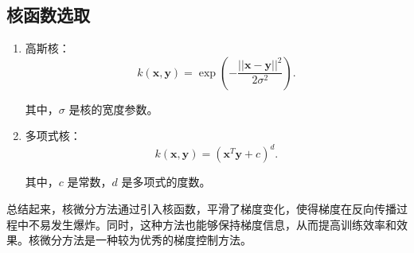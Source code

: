 \subsection{核函数选取}

\begin{enumerate}

\item 高斯核：
\begin{equation}
  k(\mathbf{x}, \mathbf{y}) = \exp\left(-\frac{||\mathbf{x} - \mathbf{y}||^2}{2\sigma^2}\right).
\end{equation}

其中，\(\sigma\) 是核的宽度参数。

\item 多项式核：
\begin{equation}
  k(\mathbf{x}, \mathbf{y}) = (\mathbf{x}^T \mathbf{y} + c)^d.
\end{equation}

其中，\(c\) 是常数，\(d\) 是多项式的度数。

\end{enumerate}

总结起来，核微分方法通过引入核函数，平滑了梯度变化，使得梯度在反向传播过程中不易发生爆炸。同时，这种方法也能够保持梯度信息，从而提高训练效率和效果。核微分方法是一种较为优秀的梯度控制方法。